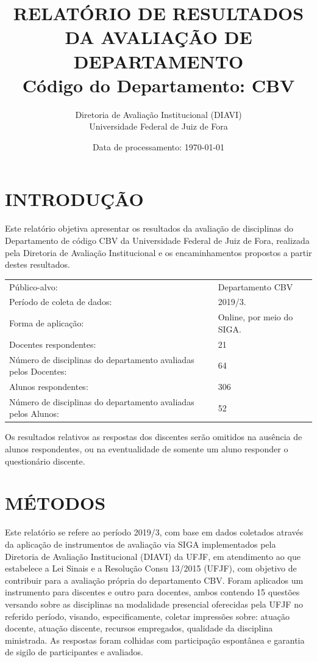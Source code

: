 \documentclass[a4paper,10pt]{article}
\date{Data de processamento: \today}
\begin{document}
\author{Diretoria de Avaliação Institucional (DIAVI) \\ Universidade Federal de Juiz de Fora}

\title{RELATÓRIO DE RESULTADOS DA AVALIAÇÃO DE DEPARTAMENTO\\ Código do Departamento: CBV}
\maketitle
\section{INTRODUÇÃO}
Este relatório objetiva apresentar os resultados da avaliação de disciplinas do Departamento     de código CBV da Universidade Federal de Juiz de Fora, realizada pela     Diretoria de Avaliação Institucional e os encaminhamentos propostos a     partir destes resultados.

\begin{center}
\begin{tabularx}{\linewidth}{X|l}

Público-alvo:& Departamento  CBV\\

Período de coleta de dados:& 2019/3.\\

Forma de aplicação:& Online, por meio do SIGA.\\

Docentes respondentes:& 21\\

Número de disciplinas do departamento avaliadas pelos Docentes:& 64\\

Alunos   respondentes:& 306\\

Número de disciplinas do departamento  avaliadas pelos   Alunos:& 52\\
\end{tabularx}
\end{center}

Os resultados relativos as respostas dos discentes serão omitidos na ausência de alunos respondentes, ou na eventualidade de somente um aluno responder o questionário discente.
\section{MÉTODOS}
Este relatório se refere ao período 2019/3, com base em dados     coletados através da aplicação de instrumentos de avaliação via SIGA     implementados pela Diretoria de Avaliação Institucional (DIAVI) da UFJF, em atendimento     ao que estabelece a Lei Sinais e a Resolução Consu 13/2015 (UFJF),     com objetivo de contribuir para a avaliação própria do departamento CBV.    Foram aplicados um instrumento para discentes e outro para docentes, ambos contendo     15 questões versando sobre as disciplinas na modalidade presencial oferecidas pela UFJF no     referido período, visando, especificamente, coletar impressões sobre: atuação docente, atuação discente,     recursos empregados, qualidade da disciplina ministrada.     As respostas foram colhidas      com participação espontânea e garantia de    sigilo de participantes e avaliados.
\end{document}
